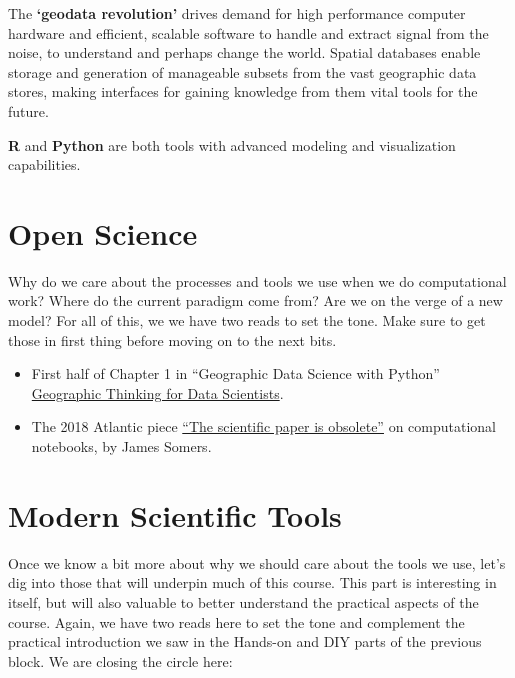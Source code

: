 \documentclass[
  letterpaper,
  DIV=11,
  numbers=noendperiod]{scrreprt}
\begin{document}
The \textbf{`geodata revolution'} drives demand for high performance
computer hardware and efficient, scalable software to handle and extract
signal from the noise, to understand and perhaps change the world.
Spatial databases enable storage and generation of manageable subsets
from the vast geographic data stores, making interfaces for gaining
knowledge from them vital tools for the future.

\textbf{R} and \textbf{Python} are both tools with advanced modeling and
visualization capabilities.

\section*{\texorpdfstring{\textbf{Open
Science}}{Open Science}}\label{open-science}


Why do we care about the processes and tools we use when we do
computational work? Where do the current paradigm come from? Are we on
the verge of a new model? For all of this, we we have two reads to set
the tone. Make sure to get those in first thing before moving on to the
next bits.

\begin{itemize}
\item
  First half of Chapter 1 in ``Geographic Data Science with Python''
  \href{https://geographicdata.science/book/notebooks/01_geo_thinking.html}{Geographic
  Thinking for Data Scientists}.
\item
  The 2018 Atlantic piece
  \href{https://juliacomputing.com/docs/press_pdfs/april5.pdf}{``The
  scientific paper is obsolete''} on computational notebooks, by James
  Somers.
\end{itemize}

\section*{\texorpdfstring{\textbf{Modern Scientific
Tools}}{Modern Scientific Tools}}\label{modern-scientific-tools}


Once we know a bit more about why we should care about the tools we use,
let's dig into those that will underpin much of this course. This part
is interesting in itself, but will also valuable to better understand
the practical aspects of the course. Again, we have two reads here to
set the tone and complement the practical introduction we saw in the
Hands-on and DIY parts of the previous block. We are closing the circle
here:
\end{document}
